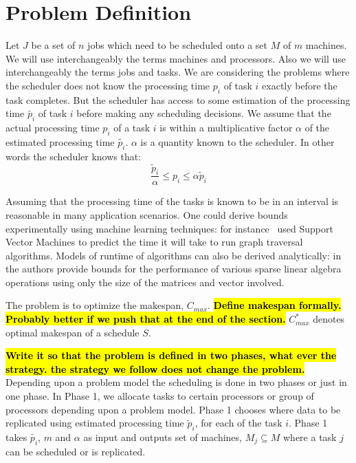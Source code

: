 \documentclass[10pt, conference, compsocconf]{IEEEtran}
\newcommand{\todo}[1]{{\color{red}\textbf{\hl{#1}}\xspace}}
\begin{document}
\section{Problem Definition}\label{sec2}
Let $J$ be a set of $n$ jobs which need to be scheduled onto a set $M$
of $m$ machines. We will use interchangeably the terms machines and
processors. Also we will use interchangeably the terms jobs and
tasks. We are considering the problems where the scheduler does not
know the processing time $p_i$ of task $i$ exactly before the task
completes.  But the scheduler has access to some estimation of the
processing time $\tilde{p_i}$ of task $i$ before making any scheduling
decisions. We assume that the actual processing time $p_i$ of a task
$i$ is within a multiplicative factor $\alpha$ of the estimated
processing time $\tilde{p_i}$. $\alpha$ is a quantity known to the
scheduler. In other words the scheduler knows that:
 \begin{equation}\label{eq1}
\frac{\tilde{p}_{i}}{\alpha}\leq p_{i}\leq \alpha \tilde{p}_{i}
\end{equation}


Assuming that the processing time of the tasks is known to be in an
interval is reasonable in many application scenarios. One could derive
bounds experimentally using machine learning techniques: for
instance~\cite{You14-ICPP} used Support Vector Machines to predict the time it
will take to run graph traversal algorithms. Models of runtime of
algorithms can also be derived analytically:
in~\cite{Erlebacher14-ICS} the authors provide bounds for the
performance of various sparse linear algebra operations using only the
size of the matrices and vector involved.

The problem is to optimize the makespan, $C_{max}$. \todo{Define
  makespan formally. Probably better if we push that at the end of the
  section.} $C_{max}^{*}$ denotes optimal makespan of a schedule $S$.

\todo{Write it so that the problem is defined in two phases, what ever
  the strategy. the strategy we follow does not change the problem.}
Depending upon a problem model the scheduling is done in two phases or
just in one phase. In Phase 1, we allocate tasks to certain processors
or group of processors depending upon a problem model.  Phase 1
chooses where data to be replicated using estimated processing time
$\tilde p_i $, for each of the task $i$. Phase 1 takes $\tilde{p_i}$,
$m$ and $\alpha$ as input and outputs set of machines, $M_j \subseteq
M $ where a task $j$ can be scheduled or is replicated.
\end{document}
